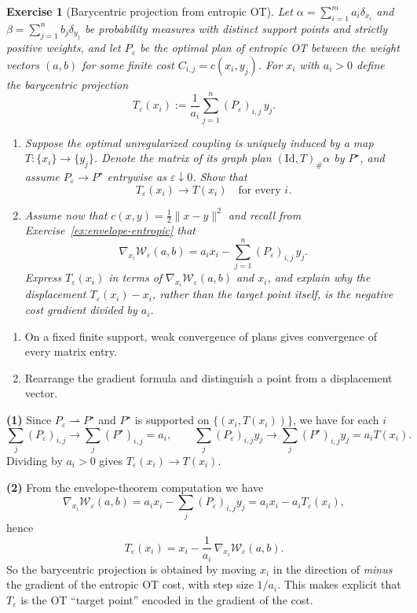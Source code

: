 \documentclass[11pt,a4paper]{article}
\theoremstyle{exostyle}
\newtheorem{exercise}{Exercise}
\newcommand{\W}{\mathcal{W}}
\begin{document}
\begin{exercise}[Barycentric projection from entropic OT]\label{ex:barycentric}
Let $\alpha=\sum_{i=1}^m a_i \delta_{x_i}$ and $\beta=\sum_{j=1}^n b_j \delta_{y_j}$ be probability measures with distinct support points and strictly positive weights, and let $P_\varepsilon$ be the optimal plan of entropic OT between the weight vectors $(a,b)$ for some finite cost $C_{i,j}=c(x_i,y_j)$. For $x_i$ with $a_i>0$ define the barycentric projection
\[
T_\varepsilon(x_i) := \frac{1}{a_i} \sum_{j=1}^n (P_\varepsilon)_{i,j} \, y_j.
\]
\begin{enumerate}[label=\textbf{(\arabic*)}]
  \item Suppose the optimal unregularized coupling is uniquely induced by a map $T:\{x_i\}\to\{y_j\}$. Denote the matrix of its graph plan $(\mathrm{Id},T)_\#\alpha$ by $P^\star$, and assume $P_\varepsilon\to P^\star$ entrywise as $\varepsilon\downarrow0$. Show that
  \[
  T_\varepsilon(x_i) \longrightarrow T(x_i)\quad\text{for every }i.
  \]
  \item Assume now that $c(x,y)=\tfrac12\|x-y\|^2$ and recall from Exercise~\ref{ex:envelope-entropic} that
  \[
  \nabla_{x_i} \W_\varepsilon(a,b) = a_i x_i - \sum_{j=1}^n (P_\varepsilon)_{i,j} \, y_j.
  \]
  Express $T_\varepsilon(x_i)$ in terms of $\nabla_{x_i} \W_\varepsilon(a,b)$ and $x_i$, and explain why the displacement $T_\varepsilon(x_i)-x_i$, rather than the target point itself, is the negative cost gradient divided by $a_i$.
\end{enumerate}
\end{exercise}
\begin{hints}
\begin{enumerate}[label=(\arabic*)]\item On a fixed finite support, weak convergence of plans gives convergence of every matrix entry.\item Rearrange the gradient formula and distinguish a point from a displacement vector.\end{enumerate}
\end{hints}
\begin{solution}
\textbf{(1)} Since $P_\varepsilon \rightharpoonup P^\star$ and $P^\star$ is supported on $\{(x_i,T(x_i))\}$, we have for each $i$
\[
\sum_j (P_\varepsilon)_{i,j} \to \sum_j (P^\star)_{i,j} = a_i,
\qquad
\sum_j (P_\varepsilon)_{i,j} y_j \to \sum_j (P^\star)_{i,j} y_j = a_i T(x_i).
\]
Dividing by $a_i>0$ gives $T_\varepsilon(x_i)\to T(x_i)$.

\medskip
\textbf{(2)} From the envelope-theorem computation we have
\[
\nabla_{x_i} \W_\varepsilon(a,b) = a_i x_i - \sum_j (P_\varepsilon)_{i,j} y_j
= a_i x_i - a_i T_\varepsilon(x_i),
\]
hence
\[
T_\varepsilon(x_i) = x_i - \frac{1}{a_i}\,\nabla_{x_i} \W_\varepsilon(a,b).
\]
So the barycentric projection is obtained by moving $x_i$ in the direction of \emph{minus} the gradient of the entropic OT cost, with step size $1/a_i$. This makes explicit that $T_\varepsilon$ is the OT ``target point'' encoded in the gradient of the cost.
\end{solution}
\end{document}
